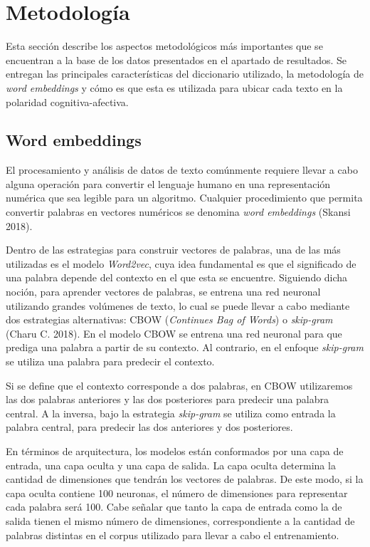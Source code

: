 \documentclass[
  12pt,
]{article}
\begin{document}
\newpage

\hypertarget{metodologuxeda}{%
\section{Metodología}\label{metodologuxeda}}

Esta sección describe los aspectos metodológicos más importantes que se
encuentran a la base de los datos presentados en el apartado de
resultados. Se entregan las principales características del diccionario
utilizado, la metodología de \emph{word embeddings} y cómo es que esta
es utilizada para ubicar cada texto en la polaridad cognitiva-afectiva.

\hypertarget{word-embeddings}{%
\subsection{\texorpdfstring{Word embeddings
\label{word_emb}}{Word embeddings }}\label{word-embeddings}}

El procesamiento y análisis de datos de texto comúnmente requiere llevar
a cabo alguna operación para convertir el lenguaje humano en una
representación numérica que sea legible para un algoritmo. Cualquier
procedimiento que permita convertir palabras en vectores numéricos se
denomina \emph{word embeddings} (Skansi 2018).

Dentro de las estrategias para construir vectores de palabras, una de
las más utilizadas es el modelo \emph{Word2vec}, cuya idea fundamental
es que el significado de una palabra depende del contexto en el que esta
se encuentre. Siguiendo dicha noción, para aprender vectores de
palabras, se entrena una red neuronal utilizando grandes volúmenes de
texto, lo cual se puede llevar a cabo mediante dos estrategias
alternativas: CBOW (\emph{Continues Bag of Words}) o \emph{skip-gram}
(Charu C. 2018). En el modelo CBOW se entrena una red neuronal para que
prediga una palabra a partir de su contexto. Al contrario, en el enfoque
\emph{skip-gram} se utiliza una palabra para predecir el contexto.

Si se define que el contexto corresponde a dos palabras, en CBOW
utilizaremos las dos palabras anteriores y las dos posteriores para
predecir una palabra central. A la inversa, bajo la estrategia
\emph{skip-gram} se utiliza como entrada la palabra central, para
predecir las dos anteriores y dos posteriores.

En términos de arquitectura, los modelos están conformados por una capa
de entrada, una capa oculta y una capa de salida. La capa oculta
determina la cantidad de dimensiones que tendrán los vectores de
palabras. De este modo, si la capa oculta contiene 100 neuronas, el
número de dimensiones para representar cada palabra será 100. Cabe
señalar que tanto la capa de entrada como la de salida tienen el mismo
número de dimensiones, correspondiente a la cantidad de palabras
distintas en el corpus utilizado para llevar a cabo el entrenamiento.
\end{document}
